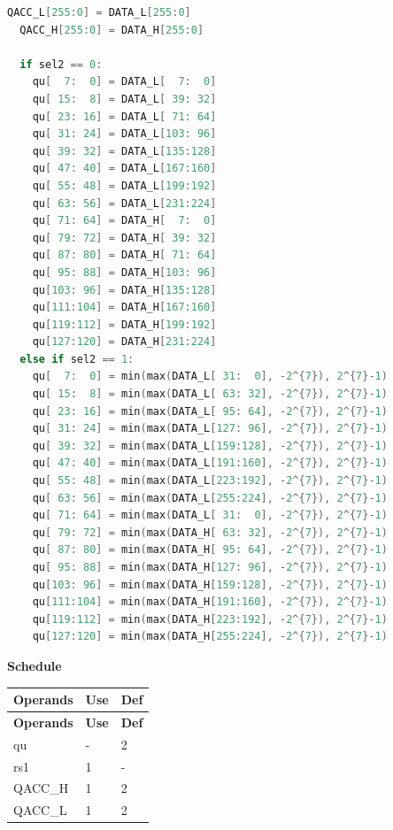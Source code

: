 \begin{lstlisting}[language=C, escapechar=@]
  QACC_L[255:0] = DATA_L[255:0]
  QACC_H[255:0] = DATA_H[255:0]

  if sel2 == 0:
    qu[  7:  0] = DATA_L[  7:  0]
    qu[ 15:  8] = DATA_L[ 39: 32]
    qu[ 23: 16] = DATA_L[ 71: 64]
    qu[ 31: 24] = DATA_L[103: 96]
    qu[ 39: 32] = DATA_L[135:128]
    qu[ 47: 40] = DATA_L[167:160]
    qu[ 55: 48] = DATA_L[199:192]
    qu[ 63: 56] = DATA_L[231:224]
    qu[ 71: 64] = DATA_H[  7:  0]
    qu[ 79: 72] = DATA_H[ 39: 32]
    qu[ 87: 80] = DATA_H[ 71: 64]
    qu[ 95: 88] = DATA_H[103: 96]
    qu[103: 96] = DATA_H[135:128]
    qu[111:104] = DATA_H[167:160]
    qu[119:112] = DATA_H[199:192]
    qu[127:120] = DATA_H[231:224]
  else if sel2 == 1:
    qu[  7:  0] = min(max(DATA_L[ 31:  0], -2^{7}), 2^{7}-1)
    qu[ 15:  8] = min(max(DATA_L[ 63: 32], -2^{7}), 2^{7}-1)
    qu[ 23: 16] = min(max(DATA_L[ 95: 64], -2^{7}), 2^{7}-1)
    qu[ 31: 24] = min(max(DATA_L[127: 96], -2^{7}), 2^{7}-1)
    qu[ 39: 32] = min(max(DATA_L[159:128], -2^{7}), 2^{7}-1)
    qu[ 47: 40] = min(max(DATA_L[191:160], -2^{7}), 2^{7}-1)
    qu[ 55: 48] = min(max(DATA_L[223:192], -2^{7}), 2^{7}-1)
    qu[ 63: 56] = min(max(DATA_L[255:224], -2^{7}), 2^{7}-1)
    qu[ 71: 64] = min(max(DATA_L[ 31:  0], -2^{7}), 2^{7}-1)
    qu[ 79: 72] = min(max(DATA_H[ 63: 32], -2^{7}), 2^{7}-1)
    qu[ 87: 80] = min(max(DATA_H[ 95: 64], -2^{7}), 2^{7}-1)
    qu[ 95: 88] = min(max(DATA_H[127: 96], -2^{7}), 2^{7}-1)
    qu[103: 96] = min(max(DATA_H[159:128], -2^{7}), 2^{7}-1)
    qu[111:104] = min(max(DATA_H[191:160], -2^{7}), 2^{7}-1)
    qu[119:112] = min(max(DATA_H[223:192], -2^{7}), 2^{7}-1)
    qu[127:120] = min(max(DATA_H[255:224], -2^{7}), 2^{7}-1)

\end{lstlisting}

\textbf{Schedule}\\
\begin{longtable}[c]{|l|l|l|}
    \hline
    \rowcolor{lightgray}
    \textbf{Operands} & \textbf{Use} & \textbf{Def} \\\hline
    \endfirsthead
    \hline
    \rowcolor{lightgray}
     \textbf{Operands} & \textbf{Use} & \textbf{Def} \\\hline
    \endhead
    \hline
    \endfoot

  qu & - & 2 \\\hline
  rs1 & 1 & - \\\hline
  QACC\_H & 1 & 2 \\\hline
  QACC\_L & 1 & 2

\end{longtable}

